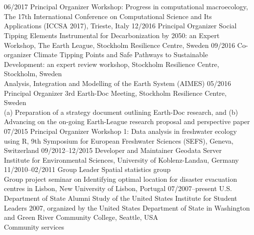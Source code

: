 \documentclass[]{friggeri-cv} %
\begin{document}
\section{}
\begin{entrylist}
\entry
{\small{06/2017}}
{Principal Organizer}
{}
{Workshop: Progress in computational macroecology, The 17th International Conference on Computational Science and Its Applications (ICCSA 2017), Trieste, Italy}
\entry
{\small{12/2016}}
{Principal Organizer}
{}
{Social Tipping Elements Instrumental for Decarbonization by 2050: an Expert Workshop, The Earth League, Stockholm Resilience Centre, Sweden}
\entry
{\small{09/2016}}
{Co-organizer}
{}
{Climate Tipping Points and Safe Pathways to Sustainable Development: an expert review workshop, Stockholm Resilience Centre, Stockholm, Sweden\\
Analysis, Integration and Modelling of the Earth System (AIMES)}
\entry
{\small{05/2016}}
{Principal Organizer}
{}
{3rd Earth-Doc Meeting, Stockholm Resilience Centre, Sweden\\
(a) Preparation of a strategy document outlining Earth-Doc research, and (b) Advancing on the on-going Earth-League research proposal and perspective paper}
\entry
{\small{07/2015}}
{Principal Organizer}
{}
{Workshop 1: Data analysis in freshwater ecology using R, 9th Symposium for European Freshwater Sciences (SEFS), Geneva, Switzerland}
\entry
{\small{09/2012--12/2015}}
{Developer and Maintainer}
{}
{Geodata Server \\ 
Institute for Environmental Sciences, University of Koblenz-Landau, Germany}
\entry
{\small{11/2010--02/2011}}
{Group Leader}
{}
{Spatial statistics group \\ 
Group project seminar on Identifying optimal location for disaster evacuation centres in Lisbon, New University of Lisbon, Portugal}
\entry
{\small{07/2007--present}}
{U.S. Department of State Alumni}
{}
{Study of the United States Institute for Student Leaders 2007, organized by the United States Department of State in Washington and Green River Community College, Seattle, USA\\
Community services}
\end{entrylist}
\end{document}
